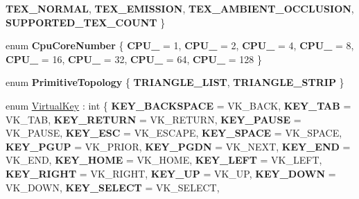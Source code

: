 \begin{DoxyCompactItemize}
{\bfseries T\+E\+X\+\_\+\+N\+O\+R\+M\+AL}, 
{\bfseries T\+E\+X\+\_\+\+E\+M\+I\+S\+S\+I\+ON}, 
\newline
{\bfseries T\+E\+X\+\_\+\+A\+M\+B\+I\+E\+N\+T\+\_\+\+O\+C\+C\+L\+U\+S\+I\+ON}, 
{\bfseries S\+U\+P\+P\+O\+R\+T\+E\+D\+\_\+\+T\+E\+X\+\_\+\+C\+O\+U\+NT}
 \}
\item 
\mbox{\label{namespace_blade_a5914a3cc4bab969db7ba1f424794d294}} 
enum {\bfseries Cpu\+Core\+Number} \{ \newline
{\bfseries C\+P\+U\+\_} = 1, 
{\bfseries C\+P\+U\+\_} = 2, 
{\bfseries C\+P\+U\+\_} = 4, 
{\bfseries C\+P\+U\+\_} = 8, 
\newline
{\bfseries C\+P\+U\+\_} = 16, 
{\bfseries C\+P\+U\+\_} = 32, 
{\bfseries C\+P\+U\+\_} = 64, 
{\bfseries C\+P\+U\+\_} = 128
 \}
\item 
\mbox{\label{namespace_blade_ad4fbecde6f3e533ead21764c5c709985}} 
enum {\bfseries Primitive\+Topology} \{ {\bfseries T\+R\+I\+A\+N\+G\+L\+E\+\_\+\+L\+I\+ST}, 
{\bfseries T\+R\+I\+A\+N\+G\+L\+E\+\_\+\+S\+T\+R\+IP}
 \}
\item 
\mbox{\label{namespace_blade_a15d9bde4921fb2a9a953f8d97ea49d1c}} 
enum \hyperlink{namespace_blade_a15d9bde4921fb2a9a953f8d97ea49d1c}{Virtual\+Key} \+: int \{ \newline
{\bfseries K\+E\+Y\+\_\+\+B\+A\+C\+K\+S\+P\+A\+CE} = V\+K\+\_\+\+B\+A\+CK, 
{\bfseries K\+E\+Y\+\_\+\+T\+AB} = V\+K\+\_\+\+T\+AB, 
{\bfseries K\+E\+Y\+\_\+\+R\+E\+T\+U\+RN} = V\+K\+\_\+\+R\+E\+T\+U\+RN, 
{\bfseries K\+E\+Y\+\_\+\+P\+A\+U\+SE} = V\+K\+\_\+\+P\+A\+U\+SE, 
\newline
{\bfseries K\+E\+Y\+\_\+\+E\+SC} = V\+K\+\_\+\+E\+S\+C\+A\+PE, 
{\bfseries K\+E\+Y\+\_\+\+S\+P\+A\+CE} = V\+K\+\_\+\+S\+P\+A\+CE, 
{\bfseries K\+E\+Y\+\_\+\+P\+G\+UP} = V\+K\+\_\+\+P\+R\+I\+OR, 
{\bfseries K\+E\+Y\+\_\+\+P\+G\+DN} = V\+K\+\_\+\+N\+E\+XT, 
\newline
{\bfseries K\+E\+Y\+\_\+\+E\+ND} = V\+K\+\_\+\+E\+ND, 
{\bfseries K\+E\+Y\+\_\+\+H\+O\+ME} = V\+K\+\_\+\+H\+O\+ME, 
{\bfseries K\+E\+Y\+\_\+\+L\+E\+FT} = V\+K\+\_\+\+L\+E\+FT, 
{\bfseries K\+E\+Y\+\_\+\+R\+I\+G\+HT} = V\+K\+\_\+\+R\+I\+G\+HT, 
\newline
{\bfseries K\+E\+Y\+\_\+\+UP} = V\+K\+\_\+\+UP, 
{\bfseries K\+E\+Y\+\_\+\+D\+O\+WN} = V\+K\+\_\+\+D\+O\+WN, 
{\bfseries K\+E\+Y\+\_\+\+S\+E\+L\+E\+CT} = V\+K\+\_\+\+S\+E\+L\+E\+CT, 

\end{DoxyCompactItemize}
